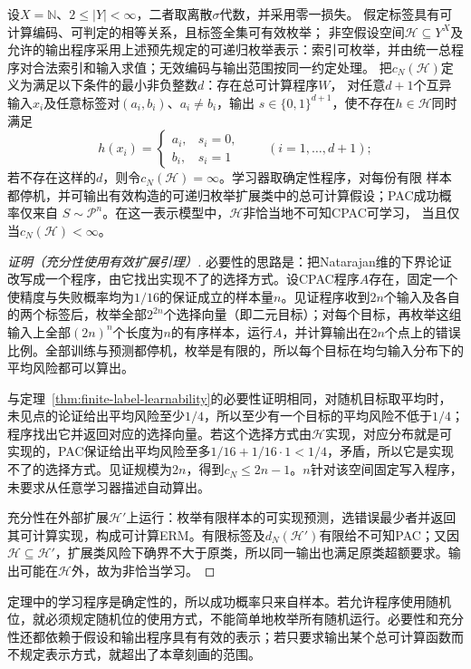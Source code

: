 \begin{theorem}[有限标签的非恰当CPAC刻画]
\label{thm:computable-multiclass-characterization}
设$X=\mathbb N$、$2\leq|Y|<\infty$，二者取离散$\sigma$代数，并采用零一损失。
假定标签具有可计算编码、可判定的相等关系，且标签全集可有效枚举；
非空假设空间$\mathcal H\subseteq Y^X$及允许的输出程序采用上述预先规定的可递归枚举表示：索引可枚举，并由统一总程序对合法索引和输入求值；无效编码与输出范围按同一约定处理。
把$c_N(\mathcal H)$定义为满足以下条件的最小非负整数$d$：存在总可计算程序$W$，
对任意$d+1$个互异输入$x_i$及任意标签对$(a_i,b_i)$、$a_i\neq b_i$，输出
$s\in\{0,1\}^{d+1}$，使不存在$h\in\mathcal H$同时满足
\[
 h(x_i)=\begin{cases}a_i,&s_i=0,\\b_i,&s_i=1\end{cases}
 \qquad(i=1,\ldots,d+1);
\]
若不存在这样的$d$，则令$c_N(\mathcal H)=\infty$。学习器取确定性程序，对每份有限
样本都停机，并可输出有效构造的可递归枚举扩展类中的总可计算假设；PAC成功概率仅来自
$S\sim\mathcal P^n$。在这一表示模型中，$\mathcal H$非恰当地不可知CPAC可学习，
当且仅当$c_N(\mathcal H)<\infty$。
\end{theorem}
\begin{proof}[证明（充分性使用有效扩展引理）]
必要性的思路是：把Natarajan维的下界论证改写成一个程序，由它找出实现不了的选择方式。设CPAC程序$A$存在，固定一个使精度与失败概率均为$1/16$的保证成立的样本量$n$。见证程序收到$2n$个输入及各自的两个标签后，枚举全部$2^{2n}$个选择向量（即二元目标）；对每个目标，再枚举这组输入上全部$(2n)^n$个长度为$n$的有序样本，运行$A$，并计算输出在$2n$个点上的错误比例。全部训练与预测都停机，枚举是有限的，所以每个目标在均匀输入分布下的平均风险都可以算出。

与定理~\ref{thm:finite-label-learnability}的必要性证明相同，对随机目标取平均时，未见点的论证给出平均风险至少$1/4$，所以至少有一个目标的平均风险不低于$1/4$；程序找出它并返回对应的选择向量。若这个选择方式由$\mathcal H$实现，对应分布就是可实现的，PAC保证给出平均风险至多$1/16+1/16\cdot1<1/4$，矛盾，所以它是实现不了的选择方式。见证规模为$2n$，得到$c_N\leq2n-1$。$n$针对该空间固定写入程序，未要求从任意学习器描述自动算出。

充分性在外部扩展$\mathcal H'$上运行：枚举有限样本的可实现预测，选错误最少者并返回其可计算实现，构成可计算ERM。有限标签及$d_N(\mathcal H')$有限给不可知PAC；又因$\mathcal H\subseteq\mathcal H'$，扩展类风险下确界不大于原类，所以同一输出也满足原类超额要求。输出可能在$\mathcal H$外，故为非恰当学习。
\end{proof}

定理中的学习程序是确定性的，所以成功概率只来自样本。若允许程序使用随机位，就必须规定随机位的使用方式，不能简单地枚举所有随机运行。必要性和充分性还都依赖于假设和输出程序具有有效的表示；若只要求输出某个总可计算函数而不规定表示方式，就超出了本章刻画的范围。

